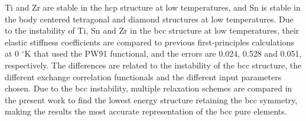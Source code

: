 Ti and Zr are stable in the hcp structure at low temperatures, and Sn is stable in the body centered tetragonal and diamond structures at low temperatures. Due to the instability of Ti, Sn and Zr in the bcc structure at low temperatures, their elastic stiffness coefficients are compared to previous first-principles calculations at 0 $^\circ$K \cite{Shang2010b} that used the PW91 functional, and the errors are 0.024, 0.528 and 0.051, respectively. The differences are related to the instability of the bcc structure, the different exchange correlation functionals and the different input parameters chosen. Due to the bcc instability, multiple relaxation schemes are compared in the present work to find the lowest energy structure retaining the bcc symmetry, making the results the most accurate representation of the bcc pure elements.  

